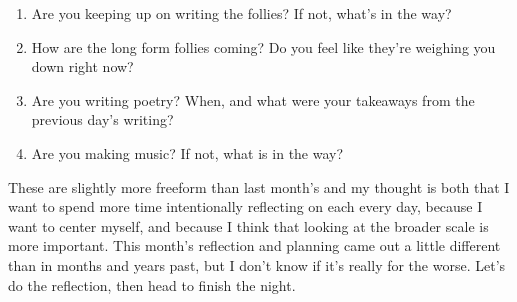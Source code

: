 \documentclass[12pt]{article}
\renewcommand{\,}{\textsuperscript{,}}
\begin{document}
\begin{enumerate}
\item Are you keeping up on writing the follies? If not, what's in the way?

\item How are the long form follies coming? Do you feel like they're weighing you down right now?

\item Are you writing poetry? When, and what were your takeaways from the previous day's writing?

\item Are you making music? If not, what is in the way?

\end{enumerate}

These are slightly more freeform than last month's and my thought is both that I want to spend more time intentionally reflecting on each every day, because I want to center myself, and because I think that looking at the broader scale is more important.  
This month's reflection and planning came out a little different than in months and years past, but I don't know if it's really for the worse.  
Let's do the reflection, then head to finish the night.
\end{document}
